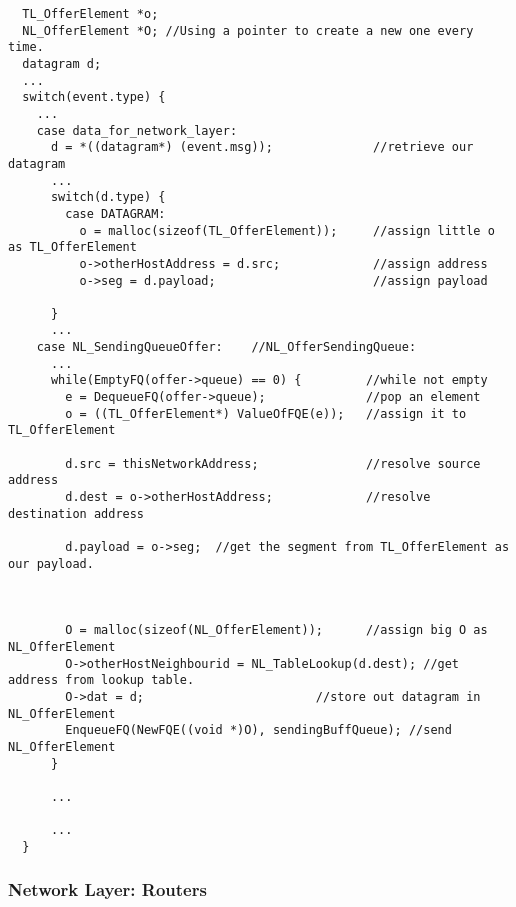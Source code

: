 \begin{lstlisting}
  TL_OfferElement *o;
  NL_OfferElement *O; //Using a pointer to create a new one every time.
  datagram d;
  ...
  switch(event.type) {
    ...
    case data_for_network_layer:
      d = *((datagram*) (event.msg));              //retrieve our datagram
      ...
      switch(d.type) {
        case DATAGRAM:
          o = malloc(sizeof(TL_OfferElement));     //assign little o as TL_OfferElement
          o->otherHostAddress = d.src;             //assign address
          o->seg = d.payload;                      //assign payload

      }
      ...
    case NL_SendingQueueOffer:    //NL_OfferSendingQueue:
      ...
      while(EmptyFQ(offer->queue) == 0) {         //while not empty
        e = DequeueFQ(offer->queue);              //pop an element
        o = ((TL_OfferElement*) ValueOfFQE(e));   //assign it to TL_OfferElement

        d.src = thisNetworkAddress;               //resolve source address
        d.dest = o->otherHostAddress;             //resolve destination address

        d.payload = o->seg;  //get the segment from TL_OfferElement as our payload.



        O = malloc(sizeof(NL_OfferElement));      //assign big O as NL_OfferElement
        O->otherHostNeighbourid = NL_TableLookup(d.dest); //get address from lookup table.
        O->dat = d;                        //store out datagram in NL_OfferElement
        EnqueueFQ(NewFQE((void *)O), sendingBuffQueue); //send NL_OfferElement
      }

      ...

      ...
  }
\end{lstlisting}



\subsubsection{Network Layer: Routers}

